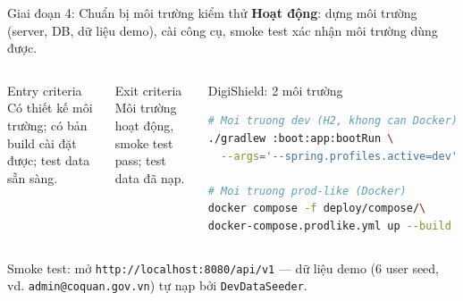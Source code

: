 \documentclass[aspectratio=169,12pt]{beamer}
\begin{document}
\begin{frame}[fragile]{Giai đoạn 4: Chuẩn bị môi trường kiểm thử}
  \textbf{Hoạt động}: dựng môi trường (server, DB, dữ liệu demo), cài công cụ,
  smoke test xác nhận môi trường dùng được.

  \vspace{0.3em}
  \begin{columns}[T]
    \begin{block}{Entry criteria}
      \small Có thiết kế môi trường; có bản build cài đặt được; test data sẵn sàng.
    \end{block}
    \begin{block}{Exit criteria}
      \small Môi trường hoạt động, smoke test pass; test data đã nạp.
    \end{block}
    \begin{exampleblock}{\small DigiShield: 2 môi trường}
\begin{lstlisting}[language=bash,basicstyle=\ttfamily\scriptsize]
# Moi truong dev (H2, khong can Docker)
./gradlew :boot:app:bootRun \
  --args='--spring.profiles.active=dev'

# Moi truong prod-like (Docker)
docker compose -f deploy/compose/\
docker-compose.prodlike.yml up --build
\end{lstlisting}
    \end{exampleblock}
  \end{columns}

  \vspace{0.2em}
  \small Smoke test: mở \texttt{http://localhost:8080/api/v1} --- dữ liệu demo
  (6 user seed, vd. \texttt{admin@coquan.gov.vn}) tự nạp bởi \texttt{DevDataSeeder}.
\end{frame}
\end{document}
